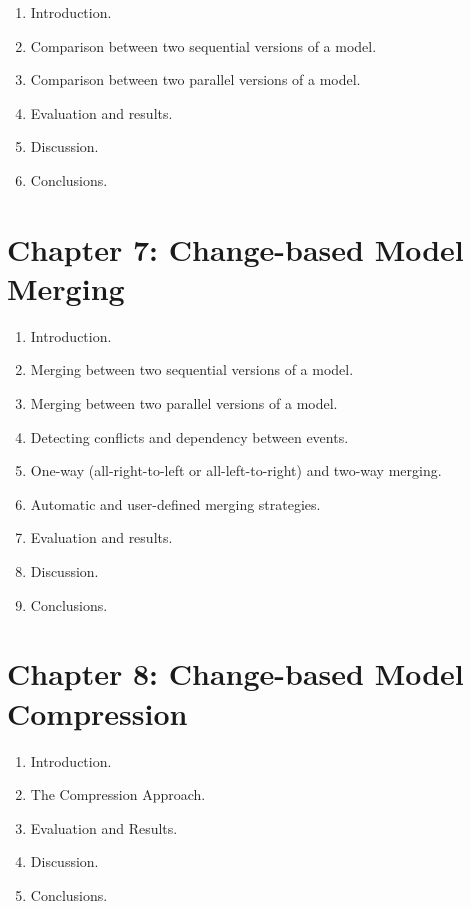 \documentclass[12pt, a4paper]{report} \usepackage[titletoc]{appendix}
\begin{document}
\begin{enumerate}
\setlength\itemsep{0pt}
\item Introduction.
\item Comparison between two sequential versions of a model.
\item Comparison between two parallel versions of a model. 
\item Evaluation and results.
\item Discussion.
\item Conclusions.
\end{enumerate}

\section{Chapter 7: Change-based Model Merging}
\label{sec:chapter_7_change_based_model_Merging}

\begin{enumerate}
\setlength\itemsep{0pt}
\item Introduction.
\item Merging between two sequential versions of a model.
\item Merging between two parallel versions of a model. 
\item Detecting conflicts and dependency between events.
\item One-way (all-right-to-left or all-left-to-right) and two-way merging.
\item Automatic and user-defined merging strategies. 
\item Evaluation and results.
\item Discussion.
\item Conclusions.
\end{enumerate}

\section{Chapter 8: Change-based Model Compression}
\label{sec:chapter_8_change_based_model_compression}

\begin{enumerate}
    \setlength\itemsep{0pt}
    \item Introduction.
    \item The Compression Approach.
    \item Evaluation and Results.
    \item Discussion.
    \item Conclusions.
\end{enumerate}
\end{document}
